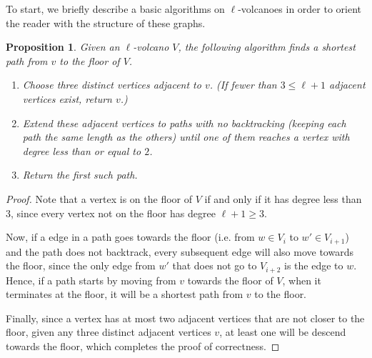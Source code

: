 \documentclass{amsart}
\newtheorem{prop}[thm]{Proposition}
\theoremstyle{definition}
\theoremstyle{remark}
\numberwithin{equation}{section}
\begin{document}
To start, we briefly describe a basic algorithms on $\ell$-volcanoes in order to orient the reader with the structure of these graphs.

\begin{prop}
Given an $\ell$-volcano $V$, the following algorithm finds a shortest path from $v$ to the floor of $V$.
\begin{enumerate}
\item Choose three distinct vertices adjacent to $v$. (If fewer than $3 \leq \ell + 1$ adjacent vertices exist, return $v$.)
\item Extend these adjacent vertices to paths with no backtracking (keeping each path the same length as the others) until one of them reaches a vertex with degree less than or equal to $2$.
\item Return the first such path.
\end{enumerate}
\end{prop}

\begin{proof}
Note that a vertex is on the floor of $V$ if and only if it has degree less than $3$, since every vertex not on the floor has degree $\ell + 1 \geq 3$.

Now, if a edge in a path goes towards the floor (i.e. from $w \in V_{i}$ to $w' \in V_{i+1}$) and the path does not backtrack, every subsequent edge will also move towards the floor, since the only edge from $w'$ that does not go to $V_{i+2}$ is the edge to $w$. Hence, if a path starts by moving from $v$ towards the floor of $V$, when it terminates at the floor, it will be a shortest path from $v$ to the floor. 

Finally, since a vertex has at most two adjacent vertices that are not closer to the floor, given any three distinct adjacent vertices $v$, at least one will be descend towards the floor, which completes the proof of correctness.
\end{proof}
\end{document}
